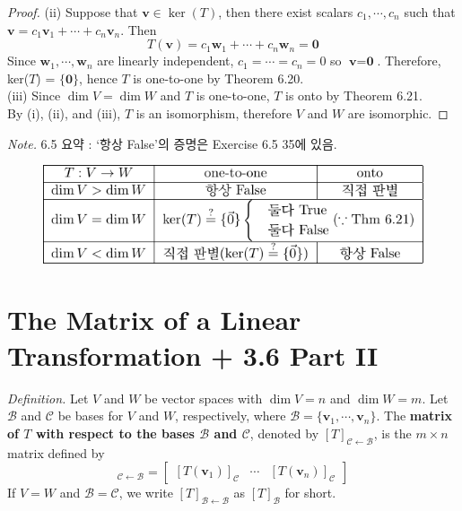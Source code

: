 \begin{proof}
	(ii) Suppose that $\textbf{v} \in \ker(T)$, then there exist scalars $c_1, \cdots, c_n$ such that $\textbf{v} = c_1\textbf{v}_1 + \cdots + c_n\textbf{v}_n$. Then \begin{equation*}
		T(\textbf{v}) = c_1\textbf{w}_1 + \cdots + c_n\textbf{w}_n = \textbf{0}
	\end{equation*} Since $\textbf{w}_1, \cdots, \textbf{w}_n$ are linearly independent, $c_1 = \cdots = c_n = 0$ so $\textbf{v} = \textbf{0}$. Therefore, ker($T$) = $\{\textbf{0}\}$, hence $T$ is one-to-one by Theorem 6.20. \\
	
	(iii) Since $\dim V = \dim W$ and $T$ is one-to-one, $T$ is onto by Theorem 6.21. \\
	
	By (i), (ii), and (iii), $T$ is an isomorphism, therefore $V$ and $W$ are isomorphic.
\end{proof}

\textit{Note.} 6.5 요약 : `항상 False'의 증명은 Exercise 6.5 35에 있음.
\begin{figure}[H]
	\begin{center}
		\includegraphics[scale = 1.0]{one-to-one+onto.pdf}
	\end{center}
\end{figure}

\section{The Matrix of a Linear Transformation + 3.6 Part II}

\textit{Definition.} Let $V$ and $W$ be vector spaces with $\dim V = n$ and $\dim W = m$. Let $\mathcal{B}$ and $\mathcal{C}$ be bases for $V$ and $W$, respectively, where $\mathcal{B} = \{ \textbf{v}_1, \cdots, \textbf{v}_n \}$. The \textbf{matrix of $T$ with respect to the bases $\mathcal{B}$ and $\mathcal{C}$}, denoted by $[T]_{ \mathcal{C} \leftarrow \mathcal{B} }$, is the $m \times n$ matrix defined by \begin{equation*}
	[T]_{ \mathcal{C} \leftarrow \mathcal{B} } = \begin{bmatrix}
	\left[ T(\textbf{v}_1) \right]_\mathcal{C} & \cdots & \left[ T(\textbf{v}_n) \right]_\mathcal{C}
	\end{bmatrix}
\end{equation*}
If $V = W$ and $\mathcal{B} = \mathcal{C}$, we write $[T]_{ \mathcal{B} \leftarrow \mathcal{B} }$ as $[T]_\mathcal{B}$ for short.


